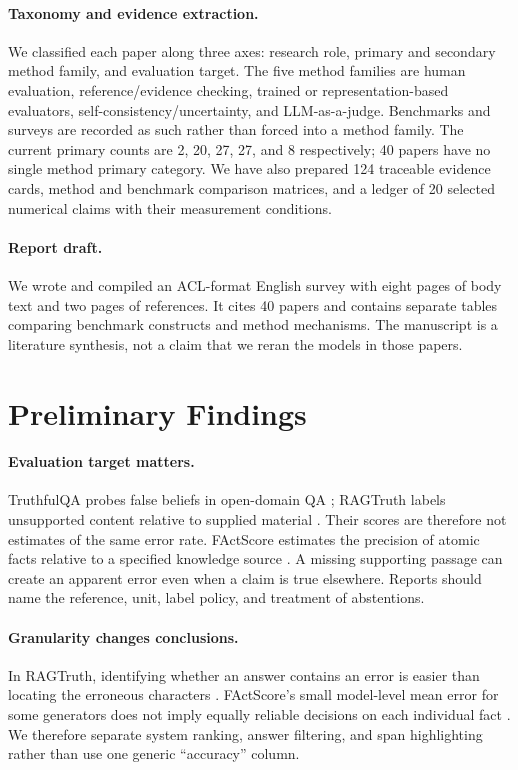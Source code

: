 \documentclass[11pt]{article}
\begin{document}
\paragraph{Taxonomy and evidence extraction.} We classified each paper along three axes: research role, primary and secondary method family, and evaluation target. The five method families are human evaluation, reference/evidence checking, trained or representation-based evaluators, self-consistency/uncertainty, and LLM-as-a-judge. Benchmarks and surveys are recorded as such rather than forced into a method family. The current primary counts are 2, 20, 27, 27, and 8 respectively; 40 papers have no single method primary category. We have also prepared 124 traceable evidence cards, method and benchmark comparison matrices, and a ledger of 20 selected numerical claims with their measurement conditions.

\paragraph{Report draft.} We wrote and compiled an ACL-format English survey with eight pages of body text and two pages of references. It cites 40 papers and contains separate tables comparing benchmark constructs and method mechanisms. The manuscript is a literature synthesis, not a claim that we reran the models in those papers.

\section{Preliminary Findings}
\paragraph{Evaluation target matters.} TruthfulQA probes false beliefs in open-domain QA \citep{C05}; RAGTruth labels unsupported content relative to supplied material \citep{C12}. Their scores are therefore not estimates of the same error rate. FActScore estimates the precision of atomic facts relative to a specified knowledge source \citep{C07}. A missing supporting passage can create an apparent error even when a claim is true elsewhere. Reports should name the reference, unit, label policy, and treatment of abstentions.

\paragraph{Granularity changes conclusions.} In RAGTruth, identifying whether an answer contains an error is easier than locating the erroneous characters \citep{C12}. FActScore's small model-level mean error for some generators does not imply equally reliable decisions on each individual fact \citep{C07}. We therefore separate system ranking, answer filtering, and span highlighting rather than use one generic ``accuracy'' column.
\end{document}
